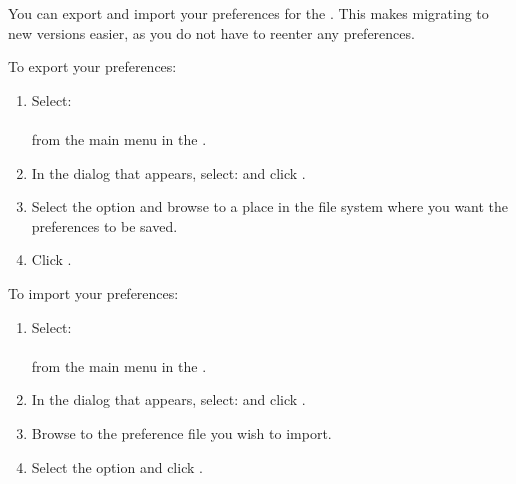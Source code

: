 You can export and import your \gddb{} preferences for the \ite{}. This makes migrating to new versions easier, as you do not have to reenter any \gddb{} preferences. 

To export your \gddb{} preferences:
\begin{enumerate}
\item Select: \\
\\
from the main menu in the \ite{}. 
\item In the dialog that appears, select:  and click .
\item Select the  option and browse to a place in the file system where you want the preferences to be saved. 
\item Click .
\end{enumerate}

To import your \gddb{} preferences:
\begin{enumerate}
\item Select: \\
\\
from the main menu in the \ite{}. 
\item In the dialog that appears, select:  and click .
\item Browse to the preference file you wish to import. 
\item Select the  option and click .
\end{enumerate}
